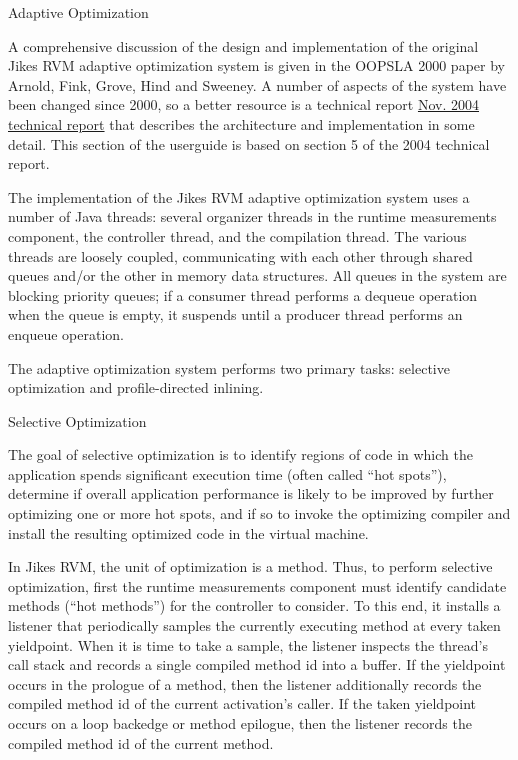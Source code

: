 \begin{chapter}{Adaptive Optimization}
\label{cha:adaptiveoptimization}

A comprehensive discussion of the design and implementation of the original Jikes RVM adaptive optimization system is given in the OOPSLA 2000 paper by Arnold, Fink, Grove, Hind and Sweeney. A number of aspects of the system have been changed since 2000, so a better resource is a technical report \href{http://domino.research.ibm.com/library/cyberdig.nsf/1e4115aea78b6e7c85256b360066f0d4/30c2b5bb5352443885256f550066b5c1%21OpenDocument}{Nov. 2004 technical report} that describes the architecture and implementation in some detail. This section of the userguide is based on section 5 of the 2004 technical report.

The implementation of the Jikes RVM adaptive optimization system uses a number of Java threads: several organizer threads in the runtime measurements component, the controller thread, and the compilation thread. The various threads are loosely coupled, communicating with each other through shared queues and/or the other in memory data structures. All queues in the system are blocking priority queues; if a consumer thread performs a dequeue operation when the queue is empty, it suspends until a producer thread performs an enqueue operation.

The adaptive optimization system performs two primary tasks: selective optimization and profile-directed inlining.

\begin{paragraph}{Selective Optimization}

The goal of selective optimization is to identify regions of code in which the application spends significant execution time (often called ``hot spots''), determine if overall application performance is likely to be improved by further optimizing one or more hot spots, and if so to invoke the optimizing compiler and install the resulting optimized code in the virtual machine.

In Jikes RVM, the unit of optimization is a method.  Thus, to perform selective optimization, first the runtime measurements component must identify candidate methods (``hot methods'') for the controller to consider. To this end, it installs a listener that periodically samples the currently executing method at every taken yieldpoint.  When it is time to take a sample, the listener inspects the thread's call stack and records a single compiled method id into a buffer. If the yieldpoint occurs in the prologue of a method, then the listener additionally records the compiled method id of the current activation's caller.  If the taken yieldpoint occurs on a loop backedge or method epilogue, then the listener records the compiled method id of the current method. 


\end{paragraph}
\end{chapter}
